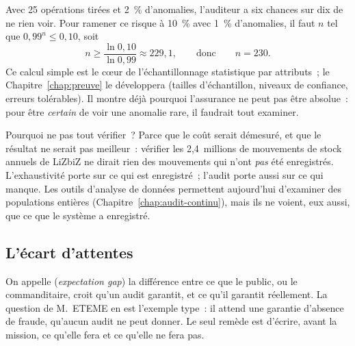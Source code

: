 Avec 25 opérations tirées et 2~\% d'anomalies, l'auditeur a six chances sur
dix de ne rien voir. Pour ramener ce risque à 10~\% avec 1~\% d'anomalies,
il faut $n$ tel que $0{,}99^{n} \leq 0{,}10$, soit
\[
    n \geq \frac{\ln 0{,}10}{\ln 0{,}99} \approx 229{,}1,
    \qquad\text{donc}\qquad n = 230.
\]
Ce calcul simple est le cœur de l'échantillonnage statistique par
attributs~; le Chapitre~\ref{chap:preuve} le développera (tailles
d'échantillon, niveaux de confiance, erreurs tolérables). Il montre déjà
pourquoi l'assurance ne peut pas être absolue~: pour être \emph{certain} de
voir une anomalie rare, il faudrait tout examiner.

\begin{boiteRemarque}{Pourquoi ne pas tout vérifier~?}
Parce que le coût serait démesuré, et que le résultat ne serait pas
meilleur~: vérifier les 2,4~millions de mouvements de stock annuels de
LiZbiZ ne dirait rien des mouvements qui n'ont \emph{pas} été enregistrés.
L'exhaustivité porte sur ce qui est enregistré~; l'audit porte aussi sur ce
qui manque. Les outils d'analyse de données permettent aujourd'hui
d'examiner des populations entières (Chapitre~\ref{chap:audit-continu}),
mais ils ne voient, eux aussi, que ce que le système a enregistré.
\end{boiteRemarque}

\subsection{L'écart d'attentes}

On appelle 
(\textit{expectation gap}) la différence entre ce que le public, ou le
commanditaire, croit qu'un audit garantit, et ce qu'il garantit réellement.
La question de M.~ETEME en est l'exemple type~: il attend une garantie
d'absence de fraude, qu'aucun audit ne peut donner. Le seul remède est
d'écrire, avant la mission, ce qu'elle fera et ce qu'elle ne fera pas.

